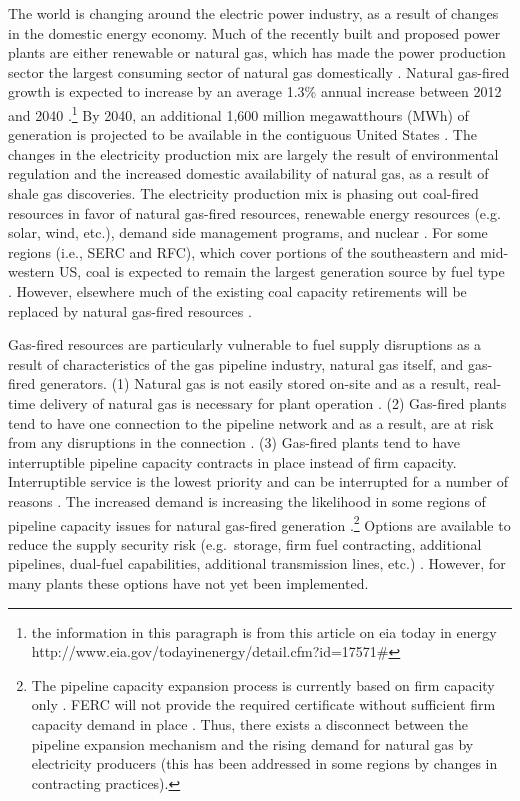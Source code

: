 \documentclass[10pt]{amsart}
\begin{document}
	The world is changing around the electric power industry, as a result of changes in the domestic energy economy. 
	Much of the recently built and proposed power plants are either renewable or natural gas, which has made the power production sector the largest consuming sector of natural gas domestically \parencite{nerc2011gas}.
	Natural gas-fired growth is expected to increase by an average 1.3\% annual increase between 2012 and 2040 \parencite{eia2014annual}.\footnote{the information in this paragraph is from this article on eia today in energy http://www.eia.gov/todayinenergy/detail.cfm?id=17571\#} 
	By 2040, an additional 1,600 million megawatthours (MWh) of generation is projected to be available in the contiguous United States \parencite{eia2014annual}. 
	The changes in the electricity production mix are largely the result of environmental regulation and the increased domestic availability of natural gas, as a result of shale gas discoveries.
	The electricity production mix is phasing out coal-fired resources in favor of natural gas-fired resources, renewable energy resources (e.g. solar, wind, etc.), demand side management programs, and nuclear \parencite{nerc2011gads}. 
	For some regions (i.e., SERC and RFC), which cover portions of the southeastern and mid-western US, coal is expected to remain the largest generation source by fuel type \parencite{eia2014annual}.
	However, elsewhere much of the existing coal capacity retirements will be replaced by natural gas-fired resources \parencite{eia2014annual}.
	
	Gas-fired resources are particularly vulnerable to fuel supply disruptions as a result of characteristics of the gas pipeline industry, natural gas itself, and gas-fired generators. 
	(1) Natural gas is not easily stored on-site and as a result, real-time delivery of natural gas is necessary for plant operation \parencite{nerc2013gas}.
	(2) Gas-fired plants tend to have one connection to the pipeline network and as a result, are at risk from any disruptions in the connection \parencite{nerc2013gas}.
	(3) Gas-fired plants tend to have interruptible pipeline capacity contracts in place instead of firm capacity.
	Interruptible service is the lowest priority and can be interrupted for a number of reasons \parencite{nerc2013gas}.
	The increased demand is increasing the likelihood in some regions of pipeline capacity issues for natural gas-fired generation \parencite{nerc2013gas}.\footnote{The pipeline capacity expansion process is currently based on firm capacity only \parencite{nerc2013gas}. FERC will not provide the required certificate without sufficient firm capacity demand in place \parencite{nerc2013gas}. Thus, there exists a disconnect between the pipeline expansion mechanism and the rising demand for natural gas by electricity producers (this has been addressed in some regions by changes in contracting practices).}	
	Options are available to reduce the supply security risk (e.g.\ storage, firm fuel contracting, additional pipelines, dual-fuel capabilities, additional transmission lines, etc.) \parencite{nerc2011gas}.
	However, for many plants these options have not yet been implemented. 
	
\end{document}
